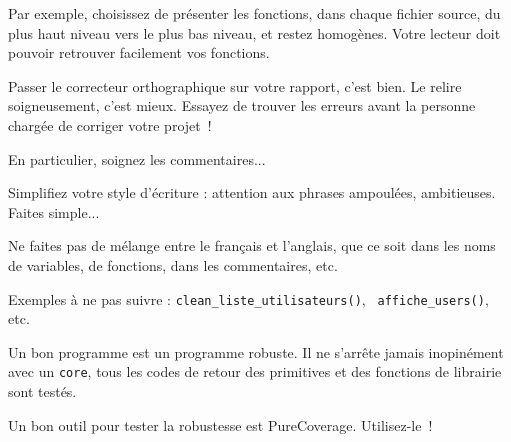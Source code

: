 

Par exemple, choisissez de présenter les fonctions, dans chaque fichier
source, du plus haut niveau vers le plus bas niveau, et restez
homogènes. Votre lecteur doit pouvoir retrouver facilement vos
fonctions.




Passer le correcteur orthographique sur votre rapport, c'est bien.
Le relire soigneusement, c'est mieux. Essayez de trouver les erreurs
avant la personne chargée de corriger votre projet~!




En particulier, soignez les commentaires...



Simplifiez votre style d'écriture : attention aux phrases ampoulées,
ambitieuses. Faites simple...



Ne faites pas de mélange entre le français et l'anglais, que ce soit
dans les noms de variables, de fonctions, dans les commentaires, etc.

Exemples à ne pas suivre : {\tt clean\_liste\_utilisateurs()}, {\tt
affiche\_users()}, etc.



Un bon programme est un programme robuste. Il ne s'arrête jamais
inopinément avec un {\tt core}, tous les codes de retour des
primitives et des fonctions de librairie sont testés.

Un bon outil pour tester la robustesse est PureCoverage. Utilisez-le~!


